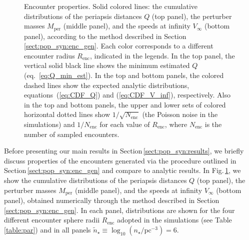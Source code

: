\documentclass[iop,usenatbib]{emulateapj}
\renewcommand{\S}{Section}
\newcommand{\F}{Fig.}
\newcommand{\renc}{R_\mathrm{enc}}
\newcommand{\mper}{M_\mathrm{per}}
\begin{document}
\begin{figure}
\center
\iftoggle{ApJFigs}{
\texttt{[image: encounter\_properties\_run04\_enc\_b]}
}{
\texttt{[image: figs/encounter\_properties\_run04\_enc\_b]}
}
\caption { Encounter properties. Solid colored lines: the cumulative distributions of the periapsis distances $Q$ (top panel), the perturber masses $\mper$ (middle panel), and the speeds at infinity $V_\infty$ (bottom panel), according to the method described in \S\,\ref{sect:pop_syn:enc_gen}. Each color corresponds to a different encounter radius $\renc$, indicated in the legends. In the top panel, the vertical solid black line shows the minimum estimated $Q$ (eq.~\ref{eq:Q_min_est}). In the top and bottom panels, the colored dashed lines show the expected analytic distributions, equations~(\ref{eq:CDF_Q}) and (\ref{eq:CDF_V_inf}), respectively. Also in the top and bottom panels, the upper and lower sets of colored horizontal dotted lines show $1/\sqrt{N_\mathrm{enc}}$ (the Poisson noise in the simulations) and $1/N_\mathrm{enc}$ for each value of $\renc$, where $N_\mathrm{enc}$ is the number of sampled encounters.}
\label{fig:enc}
\end{figure}

Before presenting our main results in \S\,\ref{sect:pop_syn:results}, we briefly discuss properties of the encounters generated via the procedure outlined in \S\,\ref{sect:pop_syn:enc_gen} and compare to analytic results. In \F\,\ref{fig:enc}, we show the cumulative distributions of the periapsis distances $Q$ (top panel), the perturber masses $\mper$ (middle panel), and the speeds at infinity $V_\infty$ (bottom panel), obtained numerically through the method described in \S\,\ref{sect:pop_syn:enc_gen}. In each panel, distributions are shown for the four different encounter sphere radii $\renc$ adopted in the simulations (see Table\,\ref{table:par}) and in all panels $\tilde{n}_\star \equiv \log_{10}(n_\star/\mathrm{pc^{-3}}) = 6$.
\end{document}
